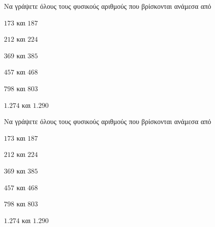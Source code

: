 Να γράψετε όλους τους φυσικούς αριθμούς που βρίσκονται ανάμεσα από
\begin{multicols}{2}
\begin{rlist}
\item $ 173 $ και $ 187 $
\item $ 212 $ και $ 224 $
\item $ 369 $ και $ 385 $
\item $ 457 $ και $ 468 $
\item $ 798 $ και $ 803 $
\item $ 1.274 $ και $ 1.290 $
\end{rlist}
\end{multicols}
Να γράψετε όλους τους φυσικούς αριθμούς που βρίσκονται ανάμεσα από
\begin{multicols}{2}
\begin{rlist}
\item $ 173 $ και $ 187 $
\item $ 212 $ και $ 224 $
\item $ 369 $ και $ 385 $
\item $ 457 $ και $ 468 $
\item $ 798 $ και $ 803 $
\item $ 1.274 $ και $ 1.290 $
\end{rlist}
\end{multicols}

